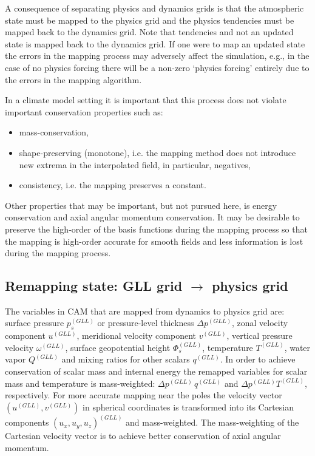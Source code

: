 \documentclass[twocol]{ametsoc}
\begin{document}
A consequence of separating physics and dynamics grids is that the atmospheric state must be mapped to the physics grid and the physics tendencies must be mapped back to the dynamics grid. Note that tendencies and not an updated state is mapped back to the dynamics grid. If one were to map an updated state the errors in the mapping process may adversely affect the simulation, e.g., in the case of no physics forcing there will be a non-zero `physics forcing' entirely due to the errors in the mapping algorithm.

In a climate model setting it is important that this process does not violate important conservation properties such as:
\begin{itemize}
\item mass-conservation,
\item shape-preserving (monotone), i.e. the mapping method does not introduce new extrema in the interpolated field, in particular, negatives,
\item consistency, i.e. the mapping preserves a constant.
\end{itemize}
Other properties that may be important, but not pursued here, is energy conservation and axial angular momentum conservation. It may be desirable to preserve the high-order of the basis functions during the mapping process so that the mapping is high-order accurate for smooth fields and less information is lost during the mapping process. 


\subsection{Remapping state: GLL grid $\rightarrow$ physics grid}
The variables in CAM that are mapped from dynamics to physics grid are: surface pressure $p_s^{(GLL)}$ or pressure-level thickness $\Delta p^{(GLL)}$, zonal velocity component $u^{(GLL)}$, meridional velocity component $v^{(GLL)}$, vertical pressure velocity $\omega^{(GLL)}$, surface geopotential height $\Phi_s^{(GLL)}$, temperature $T^{(GLL)}$, water vapor $Q^{(GLL)}$ and mixing ratios for other scalars $q^{(GLL)}$. In order to achieve conservation of scalar mass and internal energy the remapped variables for scalar mass and temperature is mass-weighted: $\Delta p^{(GLL)}\, q^{(GLL)}$ and $\Delta p^{(GLL)} T^{(GLL)}$, respectively. For more accurate mapping near the poles the velocity vector $(u^{(GLL)},v^{(GLL)})$ in spherical coordinates is transformed into its Cartesian components $(u_x,u_y,u_z)^{(GLL)}$ and mass-weighted. The mass-weighting of the Cartesian velocity vector is to achieve better conservation of axial angular momentum.
\end{document}
